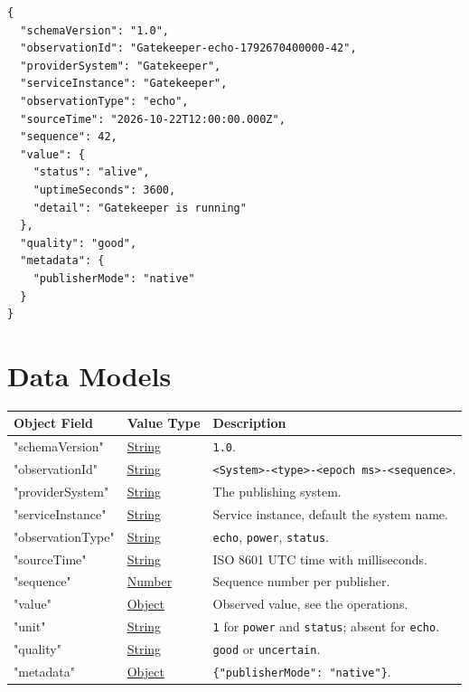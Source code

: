 \documentclass[a4paper]{arrowhead}
\newcommand{\oref}[1]{{\textcolor{ArrowheadBlue}{\hyperref[sec:operations:#1]{#1}}}}
\newcommand{\pref}[1]{{\textcolor{ArrowheadGrey}{\hyperref[sec:model:primitives:#1]{#1}}}}
\begin{document}
\begin{lstlisting}[caption={An \oref{echo} observation.}]
{
  "schemaVersion": "1.0",
  "observationId": "Gatekeeper-echo-1792670400000-42",
  "providerSystem": "Gatekeeper",
  "serviceInstance": "Gatekeeper",
  "observationType": "echo",
  "sourceTime": "2026-10-22T12:00:00.000Z",
  "sequence": 42,
  "value": {
    "status": "alive",
    "uptimeSeconds": 3600,
    "detail": "Gatekeeper is running"
  },
  "quality": "good",
  "metadata": {
    "publisherMode": "native"
  }
}
\end{lstlisting}

\newpage

\section{Data Models}
\label{sec:model}


\noindent\begin{tabularx}{\textwidth}{| p{4.25cm} | p{3.5cm} | X |} \hline
\rowcolor{gray!33} Object Field & Value Type & Description \\ \hline
"schemaVersion" & \pref{String} & \texttt{1.0}. \\ \hline
"observationId" & \pref{String} & \texttt{<System>-<type>-<epoch ms>-<sequence>}. \\ \hline
"providerSystem" & \pref{String} & The publishing system. \\ \hline
"serviceInstance" & \pref{String} & Service instance, default the system name. \\ \hline
"observationType" & \pref{String} & \texttt{echo}, \texttt{power}, \texttt{status}. \\ \hline
"sourceTime" & \pref{String} & ISO 8601 UTC time with milliseconds. \\ \hline
"sequence" & \pref{Number} & Sequence number per publisher. \\ \hline
"value" & \pref{Object} & Observed value, see the operations. \\ \hline
"unit" & \pref{String} & \texttt{1} for \texttt{power} and \texttt{status}; absent for \texttt{echo}. \\ \hline
"quality" & \pref{String} & \texttt{good} or \texttt{uncertain}. \\ \hline
"metadata" & \pref{Object} & \texttt{\{"publisherMode": "native"\}}. \\ \hline
\end{tabularx}
\end{document}
